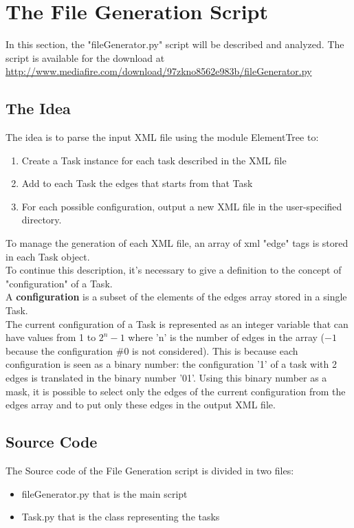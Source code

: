 \documentclass[../main.tex]{subfiles}
\begin{document}
\section{The File Generation Script}
In this section, the "fileGenerator.py" script will be described and analyzed. The script is available for the download at \url{http://www.mediafire.com/download/97zkno8562e983b/fileGenerator.py}
  \subsection{The Idea}
    The idea is to parse the input XML file using the module ElementTree\cite{elemtree} to:
    \begin{enumerate}
      \item Create a Task instance for each task described in the XML file
      \item Add to each Task the edges that starts from that Task
      \item For each possible configuration, output a new XML file in the user-specified directory.
    \end{enumerate}
    To manage the generation of each XML file, an array of xml "edge" tags is stored in each Task object. \\
    To continue this description, it's necessary to give a definition to the concept of "configuration" of a Task.\\
    A \textbf{configuration} is a subset of the elements of the edges array stored in a single Task.\\
    The current configuration of a Task is represented as an integer variable that can have values from 1 to $2^n-1$ where 'n' is the number of edges in the array ($-1$ because the configuration \#0 is not considered).
    This is because each configuration is seen as a binary number: the configuration '1' of a task with 2 edges is translated in the binary number '01'. Using this binary number as a mask, it is possible to select only the edges of the current configuration from the edges array and to put only these edges in the output XML file.
  \subsection{Source Code}
    The Source code of the File Generation script is divided in two files:
    \begin{itemize}
      \item fileGenerator.py that is the main script
      \item Task.py that is the class representing the tasks
    \end{itemize}
\end{document}
